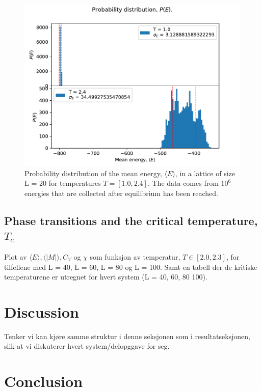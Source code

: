 \documentclass[12pt,english,a4paper]{article}
\begin{document}
\begin{figure}[H]
    \centering
    \includegraphics[scale=0.7]{Code_Files/Figures/Probability_Distribution_N_1000000000_L_20.pdf}
    \caption{Probability distribution of the mean energy, $\langle E\rangle$, in a lattice of size L = 20 for temperatures $T = [1.0,2.4]$. The data comes from $10^6$ energies that are collected after equilibrium has been reached.}
    \label{fig:probability}
\end{figure}

\subsection{Phase transitions and the critical temperature, $T_c$}

Plot av $\langle E\rangle, \langle |M|\rangle, C_V$ og $\chi$ som funksjon av temperatur, $T \in [2.0,2.3]$, for tilfellene med L = 40, L = 60, L = 80 og L = 100. Samt en tabell der de kritiske temperaturene er utregnet for hvert system (L = 40, 60, 80 100).

\section{Discussion}

Tenker vi kan kjøre samme struktur i denne seksjonen som i resultatseksjonen, slik at vi diskuterer hvert system/delopggave for seg.

\section{Conclusion}
\end{document}
